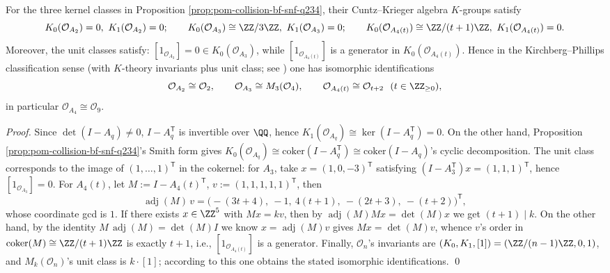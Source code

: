 \begin{proposition}\label{prop:pom-collision-ck-classification-q234}
For the three kernel classes in Proposition \ref{prop:pom-collision-bf-snf-q234}, their Cuntz--Krieger algebra \(K\)-groups satisfy
\[
K_0(\mathcal O_{A_2})=0,\ K_1(\mathcal O_{A_2})=0;\qquad
K_0(\mathcal O_{A_3})\cong \ZZ/3\ZZ,\ K_1(\mathcal O_{A_3})=0;\qquad
K_0(\mathcal O_{A_4(t)})\cong \ZZ/(t+1)\ZZ,\ K_1(\mathcal O_{A_4(t)})=0.
\]
Moreover, the unit classes satisfy: \([1_{\mathcal O_{A_3}}]=0\in K_0(\mathcal O_{A_3})\), while \([1_{\mathcal O_{A_4(t)}}]\) is a generator in \(K_0(\mathcal O_{A_4(t)})\).
Hence in the Kirchberg--Phillips classification sense (with \(K\)-theory invariants plus unit class; see \cite{Phillips2000ClassificationPurelyInfinite}) one has isomorphic identifications
\[
\mathcal O_{A_2}\cong \mathcal O_2,\qquad
\mathcal O_{A_3}\cong M_3(\mathcal O_4),\qquad
\mathcal O_{A_4(t)}\cong \mathcal O_{t+2}\ \ (t\in\ZZ_{\ge 0}),
\]
in particular \(\mathcal O_{A_4}\cong \mathcal O_9\).
\end{proposition}
\begin{proof}
Since \(\det(I-A_q)\neq 0\), \(I-A_q^\mathsf T\) is invertible over \(\QQ\), hence \(K_1(\mathcal O_{A_q})\cong\ker(I-A_q^\mathsf T)=0\).
On the other hand, Proposition \ref{prop:pom-collision-bf-snf-q234}'s Smith form gives
\(
K_0(\mathcal O_{A_q})\cong\mathrm{coker}(I-A_q^\mathsf T)\cong\mathrm{coker}(I-A_q)
\)'s cyclic decomposition.
The unit class corresponds to the image of \((1,\dots,1)^{\mathsf T}\) in the cokernel: for \(A_3\), take \(x=(1,0,-3)^{\mathsf T}\) satisfying
\(
(I-A_3^\mathsf T)x=(1,1,1)^{\mathsf T}
\), hence \([1_{\mathcal O_{A_3}}]=0\).
For \(A_4(t)\), let \(M:=I-A_4(t)^\mathsf T\), \(v:=(1,1,1,1,1)^{\mathsf T}\), then
\[
\operatorname{adj}(M)\,v=\bigl(-(3t+4),\ -1,\ 4(t+1),\ -(2t+3),\ -(t+2)\bigr)^{\mathsf T},
\]
whose coordinate gcd is \(1\). If there exists \(x\in\ZZ^{5}\) with \(Mx=kv\), then by \(\operatorname{adj}(M)Mx=\det(M)x\) we get \((t+1)\mid k\).
On the other hand, by the identity \(M\,\operatorname{adj}(M)=\det(M)I\) we know \(x=\operatorname{adj}(M)v\) gives \(Mx=\det(M)v\), whence \(v\)'s order in \(\mathrm{coker}(M)\cong \ZZ/(t+1)\ZZ\) is exactly \(t+1\), i.e., \([1_{\mathcal O_{A_4(t)}}]\) is a generator.
Finally, \(\mathcal O_n\)'s invariants are \((K_0,K_1,[1])=(\ZZ/(n-1)\ZZ,0,1)\), and \(M_k(\mathcal O_n)\)'s unit class is \(k\cdot [1]\); according to this one obtains the stated isomorphic identifications. \qed
\end{proof}

